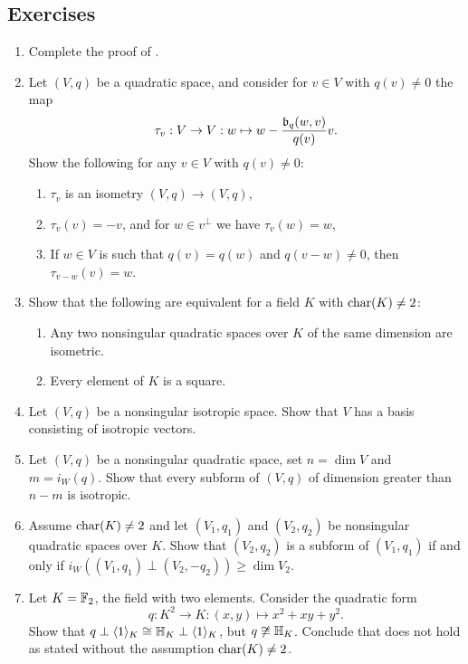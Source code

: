 \documentclass[12pt, leqno, british]{amsart}
\begin{document}
\subsection{Exercises}
\begin{enumerate}
\item Complete the proof of .
\item\label{ex-reflections} Let $(V, q)$ be a quadratic space, and consider for $v \in V$ with $q(v) \neq 0$ the map
$$ \tau_v : V \to V : w \mapsto w - \frac{\mathfrak{b}_q(w, v)}{q(v)}v.$$
Show the following for any $v \in V$ with $q(v) \neq 0$:
\begin{enumerate}
\item $\tau_v$ is an isometry $(V, q) \to (V, q)$,
\item $\tau_v(v) = -v$, and for $w \in v^\perp$ we have $\tau_v(w) = w$,
\item If $w \in V$ is such that $q(v) = q(w)$ and $q(v-w) \neq 0$, then $\tau_{v-w}(v) = w$.
\end{enumerate}
\item Show that the following are equivalent for a field $K$ with $\operatorname{char}(K) \neq 2$:
\begin{enumerate}
\item Any two nonsingular quadratic spaces over $K$ of the same dimension are isometric.
\item Every element of $K$ is a square.
\end{enumerate}
\item\label{ex:basis-isotropic-vectors} Let $(V, q)$ be a nonsingular isotropic space.
Show that $V$ has a basis consisting of isotropic vectors.
\item Let $(V, q)$ be a nonsingular quadratic space, set $n = \dim V$ and $m = i_W(q)$.
Show that every subform of $(V, q)$ of dimension greater than $n - m$ is isotropic.
\item Assume $\operatorname{char}(K) \neq 2$ and let $(V_1, q_1)$ and $(V_2, q_2)$ be nonsingular quadratic spaces over $K$.
Show that $(V_2, q_2)$ is a subform of $(V_1, q_1)$ if and only if $i_W((V_1, q_1) \perp (V_2, -q_2)) \geq \dim V_2$.
\item Let $K = \mathbb F_2$, the field with two elements. Consider the quadratic form
\begin{displaymath}
q : K^2 \to K : (x, y) \mapsto x^2 + xy + y^2.
\end{displaymath}
Show that $q \perp \langle 1 \rangle_K \cong \mathbb{H}_K \perp \langle 1 \rangle_K$, but $q \not\cong \mathbb{H}_K$.
Conclude that  does not hold as stated without the assumption $\operatorname{char}(K) \neq 2$.
\end{enumerate}
\end{document}
